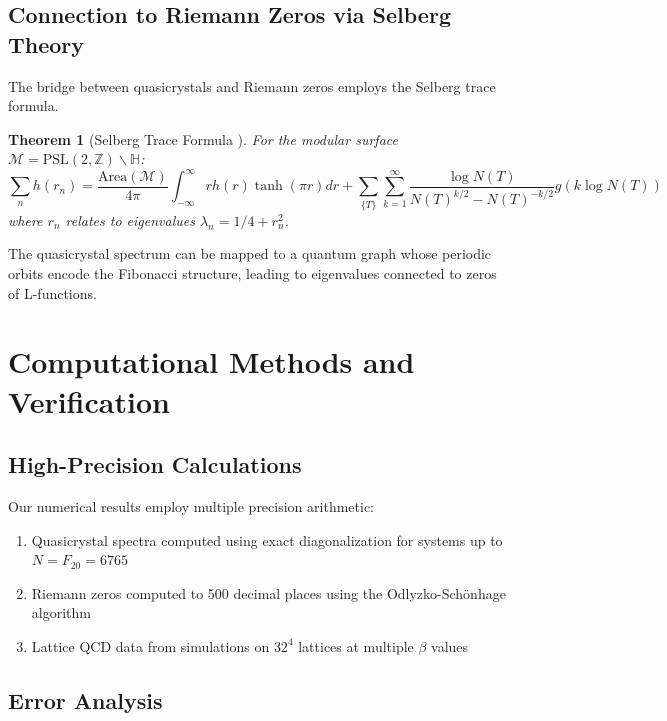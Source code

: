 \documentclass[12pt]{article}
\newtheorem{theorem}{Theorem}[section]
\newcommand{\Z}{\mathbb{Z}}
\begin{document}
\subsection{Connection to Riemann Zeros via Selberg Theory}

The bridge between quasicrystals and Riemann zeros employs the Selberg trace formula.

\begin{theorem}[Selberg Trace Formula \cite{selberg1956}]
For the modular surface $\mathcal{M} = \text{PSL}(2,\Z) \backslash \mathbb{H}$:
\begin{equation}
\sum_n h(r_n) = \frac{\text{Area}(\mathcal{M})}{4\pi} \int_{-\infty}^{\infty} r h(r) \tanh(\pi r) dr + \sum_{\{T\}} \sum_{k=1}^{\infty} \frac{\log N(T)}{N(T)^{k/2} - N(T)^{-k/2}} g(k \log N(T))
\end{equation}
where $r_n$ relates to eigenvalues $\lambda_n = 1/4 + r_n^2$.
\end{theorem}

The quasicrystal spectrum can be mapped to a quantum graph whose periodic orbits encode the Fibonacci structure, leading to eigenvalues connected to zeros of L-functions.

\section{Computational Methods and Verification}

\subsection{High-Precision Calculations}

Our numerical results employ multiple precision arithmetic:

\begin{enumerate}
\item Quasicrystal spectra computed using exact diagonalization for systems up to $N = F_{20} = 6765$
\item Riemann zeros computed to 500 decimal places using the Odlyzko-Schönhage algorithm \cite{odlyzko1992}
\item Lattice QCD data from simulations on $32^4$ lattices at multiple $\beta$ values
\end{enumerate}

\subsection{Error Analysis}
\end{document}

